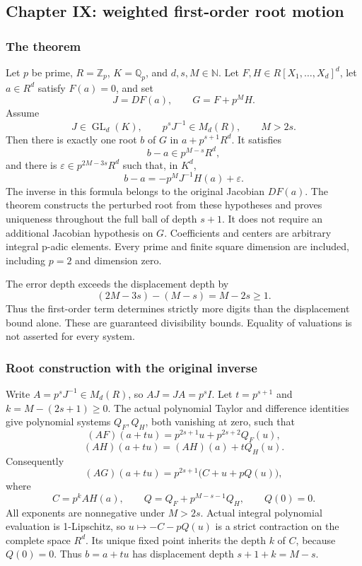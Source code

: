 \hypertarget{cont7:paper-ix-weighted-first-order-root-motion}{%
\subsection{Chapter IX: weighted first-order root
motion}\label{cont7:paper-ix-weighted-first-order-root-motion}}

\hypertarget{cont7:the-theorem}{%
\subsubsection{The theorem}\label{cont7:the-theorem}}

Let \(p\) be prime, \(R=\mathbb Z_p\), \(K=\mathbb Q_p\), and
\(d,s,M\in\mathbb N\). Let \(F,H\in R[X_1,\ldots,X_d]^d\), let
\(a\in R^d\) satisfy \(F(a)=0\), and set \[
J=DF(a),\qquad G=F+p^M H.
\] Assume \[
J\in\operatorname{GL}_d(K),\qquad p^sJ^{-1}\in M_d(R),\qquad M>2s.
\] Then there is exactly one root \(b\) of \(G\) in \(a+p^{s+1}R^d\). It
satisfies \[
b-a\in p^{M-s}R^d,
\] and there is \(\varepsilon\in p^{2M-3s}R^d\) such that, in \(K^d\),
\[
\boxed{b-a=-p^M J^{-1}H(a)+\varepsilon.}
\] The inverse in this formula belongs to the original Jacobian
\(DF(a)\). The theorem constructs the perturbed root from these
hypotheses and proves uniqueness throughout the full ball of depth
\(s+1\). It does not require an additional Jacobian hypothesis on \(G\).
Coefficients and centers are arbitrary integral p-adic elements. Every
prime and finite square dimension are included, including \(p=2\) and
dimension zero.

The error depth exceeds the displacement depth by \[
(2M-3s)-(M-s)=M-2s\ge1.
\] Thus the first-order term determines strictly more digits than the
displacement bound alone. These are guaranteed divisibility bounds.
Equality of valuations is not asserted for every system.

\hypertarget{cont7:root-construction-with-the-original-inverse}{%
\subsubsection{Root construction with the original
inverse}\label{cont7:root-construction-with-the-original-inverse}}

Write \(A=p^sJ^{-1}\in M_d(R)\), so \(AJ=JA=p^sI\). Let \(t=p^{s+1}\)
and \(k=M-(2s+1)\ge0\). The actual polynomial Taylor and difference
identities give polynomial systems \(Q_F,Q_H\), both vanishing at zero,
such that \[
(AF)(a+tu)=p^{2s+1}u+p^{2s+2}Q_F(u),
\] \[
(AH)(a+tu)=(AH)(a)+tQ_H(u).
\] Consequently \[
(AG)(a+tu)=p^{2s+1}\bigl(C+u+pQ(u)\bigr),
\] where \[
C=p^kAH(a),\qquad
Q=Q_F+p^{M-s-1}Q_H,\qquad Q(0)=0.
\] All exponents are nonnegative under \(M>2s\). Actual integral
polynomial evaluation is 1-Lipschitz, so \(u\mapsto-C-pQ(u)\) is a
strict contraction on the complete space \(R^d\). Its unique fixed point
inherits the depth \(k\) of \(C\), because \(Q(0)=0\). Thus \(b=a+tu\)
has displacement depth \(s+1+k=M-s\).

